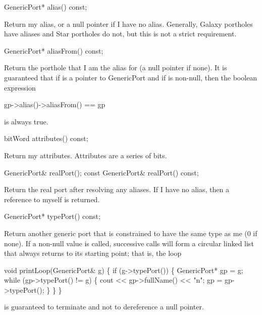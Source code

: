 \begin{example}
GenericPort* alias() const;
\end{example}

Return my alias, or a null pointer if I have no alias.  Generally,
Galaxy portholes have aliases and Star portholes do not, but this
is not a strict requirement.

\begin{example}
GenericPort* aliasFrom() const;
\end{example}

Return the porthole that I am the alias for (a null pointer if none).
It is guaranteed that if  is a pointer to GenericPort and if
 is non-null, then the boolean expression

\begin{example}
gp->alias()->aliasFrom() == gp
\end{example}

is always true.

\begin{example}
bitWord attributes() const;
\end{example}

Return my attributes.  Attributes are a series of bits.

\begin{example}
GenericPort& realPort();
const GenericPort& realPort() const;
\end{example}

Return the real port after resolving any aliases.  If I have no alias,
then a reference to myself is returned.

\begin{example}
GenericPort* typePort() const;
\end{example}

Return another generic port that is constrained to have the same type as
me (0 if none).  If a non-null value is called, successive calls will
form a circular linked list that always returns to its starting point;
that is, the loop

\begin{example}
void printLoop(GenericPort& g) \{
        if (g->typePort()) \{
                GenericPort* gp = g;
                while (gp->typePort() != g) \{
                        cout << gp->fullName() << "\back n";
                        gp = gp->typePort();
                \}
        \}
\}
\end{example}

is guaranteed to terminate and not to dereference a null pointer.

